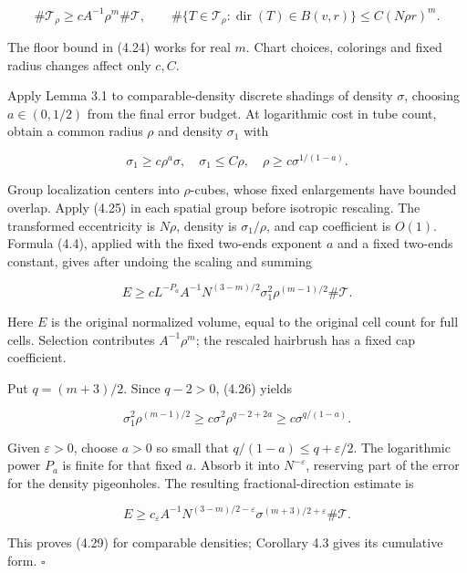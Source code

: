 \documentclass[
  11pt,
  a4paper,
]{article}
\begin{document}
\[\#\mathcal T_\rho\ge cA^{-1}\rho^m\#\mathcal T,
 \qquad
 \#\{T\in\mathcal T_\rho:\operatorname{dir}(T)\in B(v,r)\}
 \le C(N\rho r)^m.
\tag{4.25}\label{eq:4.25}\]

The floor bound in (4.24) works for real \(m\). Chart choices, colorings
and fixed radius changes affect only \(c,C\).

Apply Lemma 3.1 to comparable-density discrete shadings of density
\(\sigma\), choosing \(a\in(0,1/2)\) from the final error budget. At
logarithmic cost in tube count, obtain a common radius \(\rho\) and
density \(\sigma_1\) with

\[\sigma_1\ge c\rho^a\sigma,
 \quad \sigma_1\le C\rho,
 \quad \rho\ge c\sigma^{1/(1-a)}.
\tag{4.26}\label{eq:4.26}\]

Group localization centers into \(\rho\)-cubes, whose fixed enlargements
have bounded overlap. Apply (4.25) in each spatial group before
isotropic rescaling. The transformed eccentricity is \(N\rho\), density
is \(\sigma_1/\rho\), and cap coefficient is \(O(1)\). Formula (4.4),
applied with the fixed two-ends exponent \(a\) and a fixed two-ends
constant, gives after undoing the scaling and summing

\[E\ge cL^{-P_a} A^{-1}
 N^{(3-m)/2}\sigma_1^2\rho^{(m-1)/2}\#\mathcal T.
\tag{4.27}\label{eq:4.27}\]

Here \(E\) is the original normalized volume, equal to the original cell
count for full cells. Selection contributes \(A^{-1}\rho^m\); the
rescaled hairbrush has a fixed cap coefficient.

Put \(q=(m+3)/2\). Since \(q-2>0\), (4.26) yields

\[\sigma_1^2\rho^{(m-1)/2}
 \ge c\sigma^2\rho^{q-2+2a}
 \ge c\sigma^{q/(1-a)}.
\tag{4.28}\label{eq:4.28}\]

Given \(\varepsilon>0\), choose \(a>0\) so small that
\(q/(1-a)\le q+\varepsilon/2\). The logarithmic power \(P_a\) is finite
for that fixed \(a\). Absorb it into \(N^{-\varepsilon}\), reserving
part of the error for the density pigeonholes. The resulting
fractional-direction estimate is

\[E\ge c_\varepsilon A^{-1}N^{(3-m)/2-\varepsilon}
 \sigma^{(m+3)/2+\varepsilon}\#\mathcal T.
\tag{4.29}\label{eq:4.29}\]

This proves (4.29) for comparable densities; Corollary 4.3 gives its
cumulative form. \(\square\)
\end{document}
